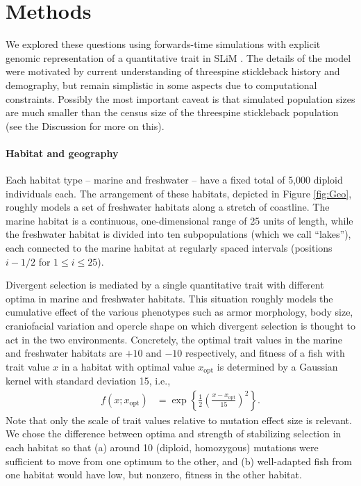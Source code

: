 \documentclass{article}
\begin{document}
\section*{Methods}

We explored these questions using forwards-time simulations with explicit genomic representation of a quantitative trait in SLiM \citep{haller2017slim,haller2018slim3}.
The details of the model were motivated by current understanding of threespine stickleback history and demography,
but remain simplistic in some aspects due to computational constraints.
Possibly the most important caveat
is that simulated population sizes are much smaller than the census size of the threespine stickleback population
(see the Discussion for more on this).

\paragraph{Habitat and geography}
Each habitat type -- marine and freshwater -- have a fixed total of 5,000 diploid individuals each. 
The arrangement of these habitats, depicted in Figure \ref{fig:Geo},
roughly models a set of freshwater habitats along a stretch of coastline. 
The marine habitat  is a continuous, one-dimensional range of 25 units of length,
while the freshwater habitat is divided into ten subpopulations (which we call ``lakes''),
each connected to the marine habitat at regularly spaced intervals
(positions $i - 1/2$ for $1 \le i \le 25$).

Divergent selection is mediated by a single quantitative trait
with different optima in marine and freshwater habitats.
This situation roughly models the cumulative effect of the various phenotypes such as armor morphology, 
body size, craniofacial variation and opercle shape on which divergent selection is thought to act
in the two environments. 
Concretely, the optimal trait values in the marine and freshwater habitats are $+10$ and $-10$ respectively,
and fitness of a fish with trait value $x$ in a habitat with optimal value $x_\text{opt}$
is determined by a Gaussian kernel with standard deviation 15, i.e.,
\begin{align*}
    f(x; x_\text{opt})
    &=
    \exp\left\{
        \frac{1}{2}
            \left(
            \frac{x-x_\text{opt}}{15}
            \right)^2
        \right\} .
\end{align*}
Note that only the scale of trait values relative to mutation effect size is relevant.
We chose the difference between optima and strength of stabilizing selection in each habitat
so that 
(a) around 10 (diploid, homozygous) mutations were sufficient to move from one optimum to the other,
and (b) well-adapted fish from one habitat would have low, but nonzero, fitness in the other habitat.
\end{document}
